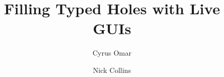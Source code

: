 \documentclass[acmsmall,review,anonymous,nonacm]{acmart}
\theoremstyle{slplain}
\numberwithin{thm}{section}
\begin{document}
\title
  [Filling Typed Holes with Live GUIs]
  {Filling Typed Holes with Live GUIs}




\author{Cyrus Omar}

\author{Nick Collins}
\end{document}
